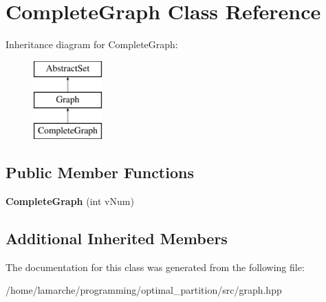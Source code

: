 \hypertarget{classCompleteGraph}{\section{Complete\-Graph Class Reference}
\label{classCompleteGraph}
}
Inheritance diagram for Complete\-Graph\-:\begin{figure}[H]
\begin{center}
\leavevmode
\includegraphics[height=3.000000cm]{classCompleteGraph}
\end{center}
\end{figure}
\subsection*{Public Member Functions}
\begin{DoxyCompactItemize}
\item 
\hypertarget{classCompleteGraph_ab74d38ce74de8bd6e413d416af89d9fa}{{\bfseries Complete\-Graph} (int v\-Num)}\label{classCompleteGraph_ab74d38ce74de8bd6e413d416af89d9fa}

\end{DoxyCompactItemize}
\subsection*{Additional Inherited Members}


The documentation for this class was generated from the following file\-:\begin{DoxyCompactItemize}
\item 
/home/lamarche/programming/optimal\-\_\-partition/src/graph.\-hpp\end{DoxyCompactItemize}
